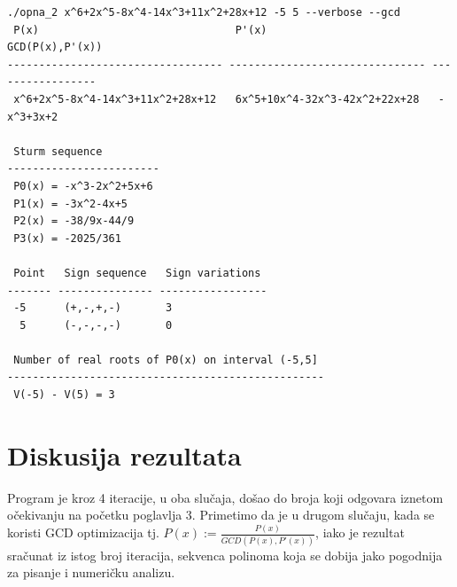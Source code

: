 \documentclass[a4paper,10pt]{article}
\begin{document}
\begin{verbatim}
./opna_2 x^6+2x^5-8x^4-14x^3+11x^2+28x+12 -5 5 --verbose --gcd
 P(x)                               P'(x)                           GCD(P(x),P'(x)) 
---------------------------------- ------------------------------- -----------------
 x^6+2x^5-8x^4-14x^3+11x^2+28x+12   6x^5+10x^4-32x^3-42x^2+22x+28   -x^3+3x+2       

 Sturm sequence         
------------------------
 P0(x) = -x^3-2x^2+5x+6 
 P1(x) = -3x^2-4x+5     
 P2(x) = -38/9x-44/9    
 P3(x) = -2025/361      

 Point   Sign sequence   Sign variations 
------- --------------- -----------------
 -5      (+,-,+,-)       3               
  5      (-,-,-,-)       0               

 Number of real roots of P0(x) on interval (-5,5] 
--------------------------------------------------
 V(-5) - V(5) = 3                                 
\end{verbatim}

\section{Diskusija rezultata}

Program je kroz 4 iteracije, u oba slučaja, došao do broja koji odgovara iznetom očekivanju na početku poglavlja 3. Primetimo da je u drugom slučaju, kada se koristi GCD optimizacija tj. 
$P(x) := \frac{P(x)}{GCD(P(x),P'(x))}$, 
iako je rezultat sračunat iz istog broj iteracija, sekvenca polinoma koja se dobija jako pogodnija za pisanje i numeričku analizu.






\end{document}
